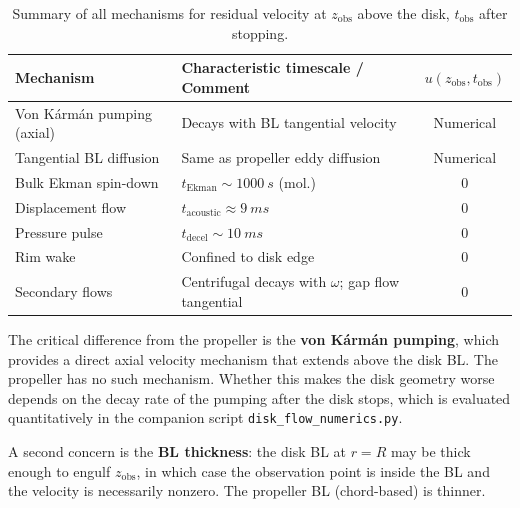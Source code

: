 \documentclass[11pt,a4paper]{article}
\begin{document}
\begin{table}[H]
\centering
\caption{Summary of all mechanisms for residual velocity at
$z_\mathrm{obs}$ above the disk, $t_\mathrm{obs}$ after stopping.}
\label{tab:summary}
\begin{tabular}{llc}
\toprule
Mechanism & Characteristic timescale / Comment
  & $u(z_\mathrm{obs}, t_\mathrm{obs})$ \\
\midrule
Von K\'arm\'an pumping (axial)
  & Decays with BL tangential velocity
  & Numerical \\
Tangential BL diffusion
  & Same as propeller eddy diffusion
  & Numerical \\
Bulk Ekman spin-down
  & $t_\mathrm{Ekman} \sim \SI{1000}{s}$ (mol.)
  & 0 \\
Displacement flow
  & $t_\mathrm{acoustic} \approx \SI{9}{ms}$
  & 0 \\
Pressure pulse
  & $t_\mathrm{decel} \sim \SI{10}{ms}$
  & 0 \\
Rim wake
  & Confined to disk edge
  & 0 \\
Secondary flows
  & Centrifugal decays with $\omega$; gap flow tangential
  & 0 \\
\bottomrule
\end{tabular}
\end{table}

The critical difference from the propeller is the \textbf{von K\'arm\'an
pumping}, which provides a direct axial velocity mechanism that extends
above the disk BL. The propeller has no such mechanism. Whether this
makes the disk geometry worse depends on the decay rate of the pumping
after the disk stops, which is evaluated quantitatively in the companion
script \texttt{disk\_flow\_numerics.py}.

A second concern is the \textbf{BL thickness}: the disk BL at $r = R$
may be thick enough to engulf $z_\mathrm{obs}$, in which case the
observation point is inside the BL and the velocity is necessarily
nonzero. The propeller BL (chord-based) is thinner.
\end{document}

